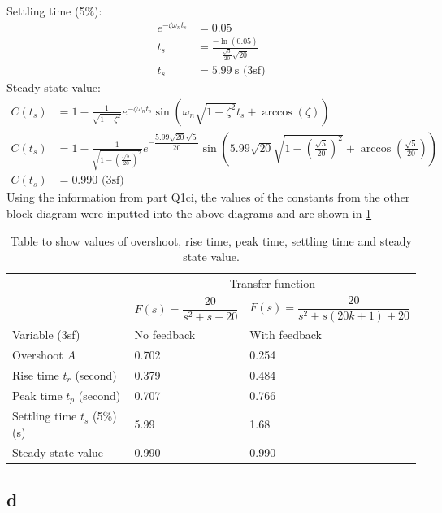 \documentclass[11pt]{article}
\numberwithin{equation}{section}
\begin{document}
Settling time (5\%):
\begin{align}
    e^{-\zeta\omega_n t_s} &= 0.05\\
    t_s &= \frac{-\ln\left(0.05\right)}{\frac{\sqrt{5}}{20} \sqrt{20}}\\
    t_s &= \SI{5.99}{\second} \textrm{ (3sf)}
\end{align}
Steady state value:
\begin{align}
    C(t_s) &= 1 - \frac{1}{\sqrt{1-\zeta^2}}e^{-\zeta \omega_n t_s}\sin\left(\omega_n \sqrt{1-\zeta^2}t_s + \arccos\left(\zeta\right)\right)\\
    C(t_s) &= 1 - \frac{1}{\sqrt{1-\left(\frac{\sqrt{5}}{20}\right)^2}}e^{-\dfrac{5.99\sqrt{20}\sqrt{5}}{20}}\sin \left(5.99\sqrt{20} \sqrt{1-\left(\frac{\sqrt{5}}{20}\right)^2}  + \arccos\left(\frac{\sqrt{5}}{20}\right)\right)\\
    C(t_s) &= 0.990 \textrm{ (3sf)}
\end{align}
Using the information from part Q1ci, the values of the constants from the other block diagram were inputted into the above diagrams and are shown in \ref{tab:q1cii1}
\begin{table}[H]
    \centering
    \begin{tabular}{lll}
        \toprule
        & \multicolumn{2}{c}{Transfer function}\\
        \cmidrule{2-3}
        & $F(s) = \dfrac{20}{s^2 + s + 20 }$ & $F(s) = \dfrac{20}{s^2 + s(20k+1) + 20}$\\
        Variable (3sf) & No feedback & With feedback\\
        \midrule
        Overshoot $A$ & 0.702 & 0.254 \\
        Rise time $t_r$ (\si{second}) & 0.379 & 0.484 \\
        Peak time $t_p$ (\si{second})& 0.707 & 0.766\\
        Settling time $t_s$ (5\%) (\si{\second}) & 5.99 & 1.68\\
        Steady state value & 0.990 & 0.990\\
        \bottomrule
    \end{tabular}
    \caption{Table to show values of overshoot, rise time, peak time, settling time and steady state value.}
    \label{tab:q1cii1}
\end{table}
\subsection{d}
\end{document}

